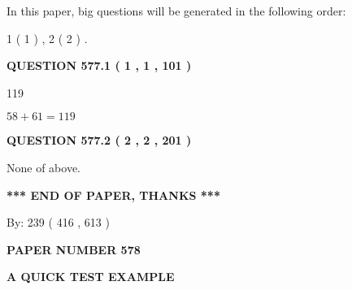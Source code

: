 \documentclass[12pt]{article}
\begin{document}
In this paper, big questions will be generated in the following order: 
   
   
   1 ( 1 )
 ,
   2 ( 2 )
 .
  
\vspace{0.2in}
  
{\textbf{\Large{QUESTION
577.1 
 ( 1 , 1 , 101 )
}}}
  
  
 
 
\noindent{}

119
 
 
 
 
\noindent{}

$ %
58 +  %
61=   %
119$
 
 
  
\vspace{0.2in}
  
{\textbf{\Large{QUESTION
577.2 
 ( 2 , 2 , 201 )
}}}
  
  
 
 
\noindent{}
 
 
 None of above.
 
 
 
 
   
   
 \vspace{0.2in}
 
   
   
   
   
\vspace{1.0in} 
{\textbf{\large{ *** END OF PAPER, THANKS *** }}} 
   
   
\hspace{1.0in} By: 
 239 ( 416 ,  613 )
   
   
   
   
\newpage 
\setcounter{page}{ 
   578001 } 
   
   
   
   
 {\textbf{ \Large{ PAPER NUMBER  578  }}}
   
   
\vspace{0.2in}
   
   
   
   
   
   
 \vspace{0.2in}
{\LARGE {\textbf{ A QUICK TEST EXAMPLE}}}
   
\end{document}
